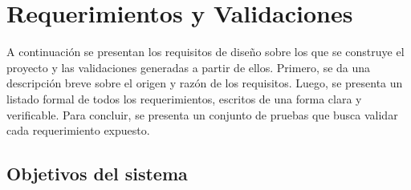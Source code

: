 


\section{Requerimientos y Validaciones}

A continuación se presentan los requisitos de diseño sobre los que se construye el proyecto y las validaciones generadas a partir de ellos. Primero, se da una descripción breve sobre el origen y razón de los requisitos. Luego, se presenta un listado formal de todos los requerimientos, escritos de una forma clara y verificable. Para concluir, se presenta un conjunto de pruebas que busca validar cada requerimiento expuesto.

\subsection{Objetivos del sistema}


